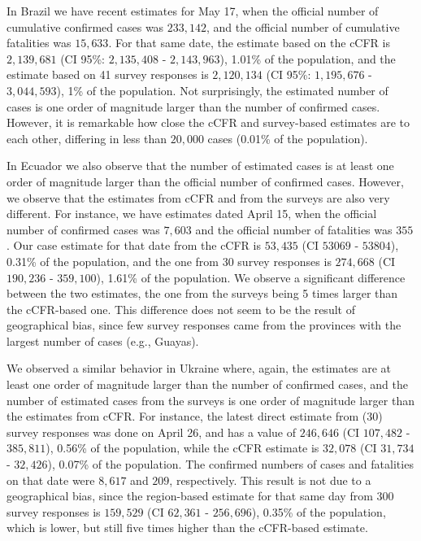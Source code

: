\documentclass{article}
\begin{document}
In Brazil we have recent estimates for May 17, when the official number of cumulative confirmed cases 
was $233,142$, and the official number of cumulative fatalities was $15,633$. For that same date, the estimate based on the cCFR is $2,139,681$ (CI 95\%: $2,135,408$ - $2,143,963$), 1.01\% of the population, and the estimate based on 41 survey responses is $2,120,134$ (CI  95\%: $1,195,676$ - $3,044,593$), 1\% of the population. Not surprisingly, the estimated number of cases is one order of magnitude larger than the number of confirmed cases. However, it is remarkable how close the cCFR and survey-based estimates are to each other, differing in less than $20,000$ cases (0.01\% of the population).

In Ecuador we also observe that the number of estimated cases is at least one order of magnitude larger than the official number of confirmed cases. However, we observe that the estimates from cCFR and from the surveys are also very different. For instance, we have estimates dated April 15, when the official number of confirmed cases was $7,603$ and the official number of fatalities was $355$. Our case estimate for that date from the cCFR is $53,435$ (CI $53069$ - $53804$), 0.31\% of the population, and the one from 30 survey responses is $274,668$ (CI $190,236$ - $359,100$), 1.61\% of the population. We observe a significant difference between the two estimates, the one from the surveys being 5 times larger than the cCFR-based one. This difference does not seem to be the result of geographical bias, since few survey responses came from the provinces with the largest number of cases (e.g., Guayas).

We observed a similar behavior in Ukraine where, again, the estimates are at least one order of magnitude larger than the number of confirmed cases, and the number of estimated cases from the surveys is one order of magnitude larger than the estimates from cCFR. For instance,
the latest direct estimate from (30) survey responses was done on April 26, and has a value of $246,646$ (CI $107,482$ - $385,811$), 0.56\% of the population, while the cCFR estimate is $32,078$ (CI $31,734$ - $32,426$), 0.07\% of the population. The confirmed numbers of cases and fatalities on that date were $8,617$ and $209$, respectively. This result is not due to a geographical bias, since the region-based estimate for that same day from 300 survey responses is $159,529$ (CI $62,361$ - $256,696$), 0.35\% of the population, which is lower, but still five times higher than the cCFR-based estimate.
\end{document}
